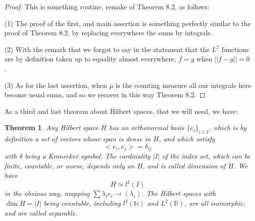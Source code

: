 \documentclass[12pt]{amsbook}
\newtheorem{theorem}{Theorem}[chapter]
\begin{document}
\begin{proof}
This is something routine, remake of Theorem 8.2, as follows:

\medskip

(1) The proof of the first, and main assertion is something perfectly similar to the proof of Theorem 8.2, by replacing everywhere the sums by integrals. 

\medskip

(2) With the remark that we forgot to say in the statement that the $L^2$ functions are by definition taken up to equality almost everywhere, $f=g$ when $||f-g||=0$.

\medskip

(3) As for the last assertion, when $\mu$ is the counting measure all our integrals here become usual sums, and so we recover in this way Theorem 8.2.
\end{proof}

As a third and last theorem about Hilbert spaces, that we will need, we have:


\begin{theorem}
Any Hilbert space $H$ has an orthonormal basis $\{e_i\}_{i\in I}$, which is by definition a set of vectors whose span is dense in $H$, and which satisfy
$$<e_i,e_j>=\delta_{ij}$$
with $\delta$ being a Kronecker symbol. The cardinality $|I|$ of the index set, which can be finite, countable, or worse, depends only on $H$, and is called dimension of $H$. We have
$$H\simeq l^2(I)$$
in the obvious way, mapping $\sum\lambda_ie_i\to(\lambda_i)$. The Hilbert spaces with $\dim H=|I|$ being countable, including $l^2(\mathbb N)$ and $L^2(\mathbb R)$, are all isomorphic, and are called separable.
\end{theorem}
\end{document}
